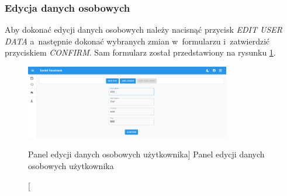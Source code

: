 \documentclass[../Kamil_Kowalewski_Main.tex]{subfiles}
\begin{document}
{{{            \subsubsection{Edycja danych osobowych}
            \label{chapter5:dok_uzytkownika:funkc_uzyt_zalog:konto_uzyt:edycja_danych} {
                Aby dokonać edycji danych osobowych należy nacisnąć przycisk
                \textit{EDIT USER DATA} a~następnie dokonać wybranych zmian w~formularzu
                i~zatwierdzić przyciskiem \textit{CONFIRM}. Sam formularz został
                przedstawiony na rysunku
                \ref{chapter5:dok_uzytkownika:funkc_uzyt_zalog:edit_user_data}.

                \begin{figure}[H]
                    \centering
                    \includegraphics[width=0.8\textwidth, keepaspectratio]
                    {img/chapter5/loggedin/edit_user_data.png}
                    \caption
                    [Panel edycji danych osobowych użytkownika]
                    {Panel edycji danych osobowych użytkownika}
                    \label{chapter5:dok_uzytkownika:funkc_uzyt_zalog:edit_user_data}
                \end{figure}
            }
        }

}}
\end{document}
